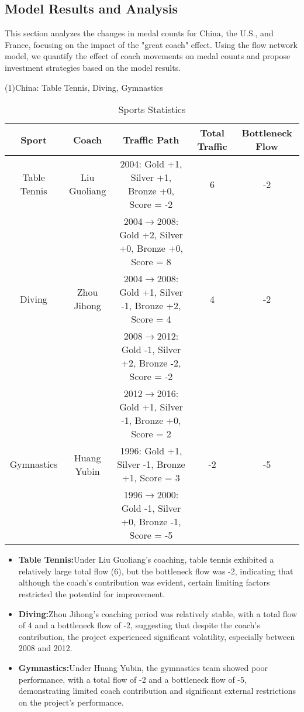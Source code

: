 \documentclass{mcmthesis}
\begin{document}
\subsection{Model Results and Analysis}

    This section analyzes the changes in medal counts for China, the U.S., and France, focusing on the impact of the "great coach" effect. Using the flow network model, we quantify the effect of coach movements on medal counts and propose investment strategies based on the model results.

    (1)China: Table Tennis, Diving, Gymnastics
    \begin{table}[ht]
        \centering
        \begin{tabular}{|c|c|c|c|c|}
        \hline
        Sport & Coach & Traffic Path & Total Traffic & Bottleneck Flow \\
        \hline
        Table Tennis & Liu Guoliang & 2004: Gold +1, Silver +1, Bronze +0, Score = -2 & 6 & -2 \\
         & & 2004$\to$2008: Gold +2, Silver +0, Bronze +0, Score = 8 & & \\
        \hline
        Diving & Zhou Jihong & 2004$\to$2008: Gold +1, Silver -1, Bronze +2, Score = 4 & 4 & -2 \\
         & & 2008$\to$2012: Gold -1, Silver +2, Bronze -2, Score = -2 & & \\
         & & 2012$\to$2016: Gold +1, Silver -1, Bronze +0, Score = 2 & & \\
        \hline
        Gymnastics & Huang Yubin & 1996: Gold +1, Silver -1, Bronze +1, Score = 3 & -2 & -5 \\
         & & 1996$\to$2000: Gold -1, Silver +0, Bronze -1, Score = -5 & & \\
        \hline
        \end{tabular}
        \caption{Sports Statistics}
    \end{table}

    \begin{itemize}
        \item {\bf Table Tennis:}Under Liu Guoliang's coaching, table tennis exhibited a relatively large total flow (6), but the bottleneck flow was -2, indicating that although the coach's contribution was evident, certain limiting factors restricted the potential for improvement.      
        \item {\bf Diving:}Zhou Jihong's coaching period was relatively stable, with a total flow of 4 and a bottleneck flow of -2, suggesting that despite the coach’s contribution, the project experienced significant volatility, especially between 2008 and 2012.    
        \item {\bf Gymnastics:}Under Huang Yubin, the gymnastics team showed poor performance, with a total flow of -2 and a bottleneck flow of -5, demonstrating limited coach contribution and significant external restrictions on the project’s performance.
    \end{itemize}
\end{document}
